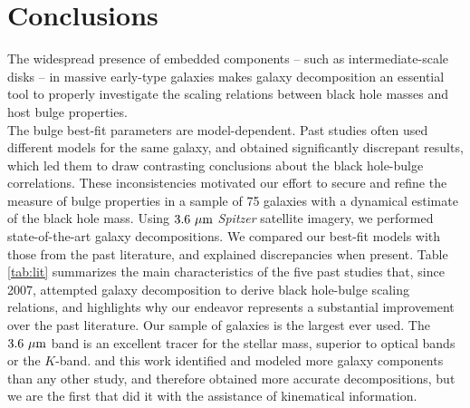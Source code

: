 \documentclass[preprint2]{emulateapj}
\begin{document}
\section{Conclusions}
\label{sec:concl}
The widespread presence of embedded components -- such as intermediate-scale disks -- in massive early-type galaxies 
makes galaxy decomposition an essential tool to properly investigate the scaling relations between black hole masses 
and host bulge properties. \\
The bulge best-fit parameters are model-dependent. 
Past studies often used different models for the same galaxy, and obtained significantly discrepant results,  
which led them to draw contrasting conclusions about the black hole-bulge correlations.
These inconsistencies motivated our effort to secure and refine the measure of bulge properties in a sample of 75 galaxies 
with a dynamical estimate of the black hole mass. 
Using $3.6~\rm \mu m$ \emph{Spitzer} satellite imagery, 
we performed state-of-the-art galaxy decompositions. 
We compared our best-fit models with those from the past literature, 
and explained discrepancies when present. 
Table \ref{tab:lit} summarizes the main characteristics of the five past studies that, since 2007, attempted galaxy decomposition 
to derive black hole-bulge scaling relations, 
and highlights why our endeavor represents a substantial improvement over the past literature.
Our sample of galaxies is the largest ever used. 
The $3.6~\rm \mu m$ band is an excellent tracer for the stellar mass, superior to optical bands or the $K$-band. 
\cite{lasker2014data} and this work identified and modeled more galaxy components than any other study, 
and therefore obtained more accurate decompositions,
but we are the first that did it with the assistance of kinematical information. 
\end{document}
